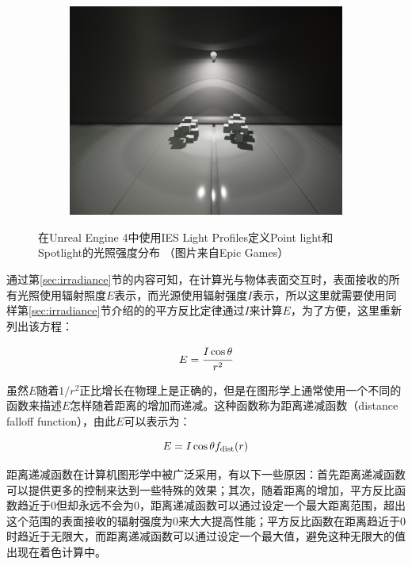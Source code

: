 \begin{figure}
\begin{fullwidth}
\begin{subfigure}[b]{0.247\thewidth}
	\end{subfigure}
	\begin{subfigure}[b]{0.293\thewidth}
		\includegraphics[width=1.\textwidth]{figures/intro/IES_04}
	\end{subfigure}
\caption{在Unreal Engine 4中使用IES Light Profiles定义Point light和Spotlight的光照强度分布 （图片来自Epic Games）}
\label{f:intro-ies}
\end{fullwidth}
\end{figure}

通过第\ref{sec:irradiance}节的内容可知，在计算光与物体表面交互时，表面接收的所有光照使用辐射照度$E$表示，而光源使用辐射强度$I$表示，所以这里就需要使用同样第\ref{sec:irradiance}节介绍的的平方反比定律通过$I$来计算$E$，为了方便，这里重新列出该方程：

\begin{equation}
	E= \cfrac{I\cos\theta}{r^{2}}
\end{equation}

\noindent 虽然$E$随着$1/r^{2}$正比增长在物理上是正确的，但是在图形学上通常使用一个不同的函数来描述$E$怎样随着距离的增加而递减。这种函数称为距离递减函数（distance falloff function），由此$E$可以表示为：

\begin{equation}
	E=I\cos\theta f_{\rm dist}(r)
\end{equation}

距离递减函数在计算机图形学中被广泛采用，有以下一些原因：首先距离递减函数可以提供更多的控制来达到一些特殊的效果；其次，随着距离的增加，平方反比函数趋近于$0$但却永远不会为$0$，距离递减函数可以通过设定一个最大距离范围，超出这个范围的表面接收的辐射强度为0来大大提高性能；平方反比函数在距离趋近于$0$时趋近于无限大，而距离递减函数可以通过设定一个最大值，避免这种无限大的值出现在着色计算中。

